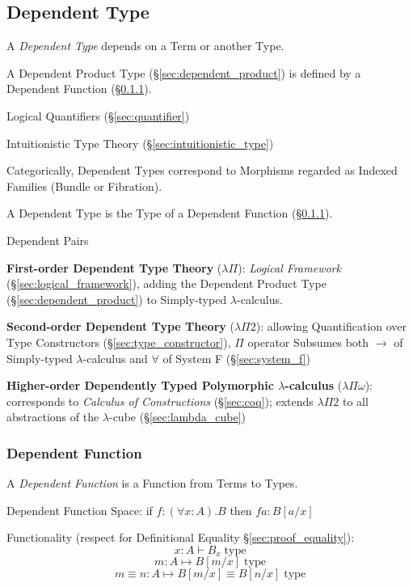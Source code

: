 \subsection{Dependent Type}\label{sec:dependent_type}

A \emph{Dependent Type} depends on a Term or another Type.

A Dependent Product Type (\S\ref{sec:dependent_product}) is defined by
a Dependent Function (\S\ref{sec:dependent_function}).

Logical Quantifiers (\S\ref{sec:quantifier})

Intuitionistic Type Theory (\S\ref{sec:intuitionistic_type})

Categorically, Dependent Types correspond to Morphisms regarded as
Indexed Families (Bundle or Fibration). %

A Dependent Type is the Type of a Dependent Function
(\S\ref{sec:dependent_function}).

Dependent Pairs

\textbf{First-order Dependent Type Theory} ($\lambda \Pi$):
\emph{Logical Framework} (\S\ref{sec:logical_framework}), adding the
Dependent Product Type (\S\ref{sec:dependent_product}) to Simply-typed
$\lambda$-calculus.

\textbf{Second-order Dependent Type Theory} ($\lambda \Pi 2$):
allowing Quantification over Type Constructors
(\S\ref{sec:type_constructor}), $\Pi$ operator Subsumes both
$\rightarrow$ of Simply-typed $\lambda$-calculus and $\forall$ of
System F (\S\ref{sec:system_f})

\textbf{Higher-order Dependently Typed Polymorphic $\lambda$-calculus}
($\lambda \Pi \omega$): corresponds to \emph{Calculus of
  Constructions} (\S\ref{sec:coq}); extends $\lambda \Pi 2$ to all
abstractions of the $\lambda$-cube (\S\ref{sec:lambda_cube})



\subsubsection{Dependent Function}\label{sec:dependent_function}

A \emph{Dependent Function} is a Function from Terms to Types.

Dependent Function Space: if $f:(\forall x: A).B$ then $f a : B[a/x]$

Functionality (respect for Definitional Equality
\S\ref{sec:proof_equality}):
\[
  x : A \vdash B_x \;\text{type}
\]\[
  m : A \mapsto B[m/x] \;\text{type}
\]\[
  m \equiv n : A \mapsto B[m/x] \equiv B[n/x] \;\text{type}
\]

